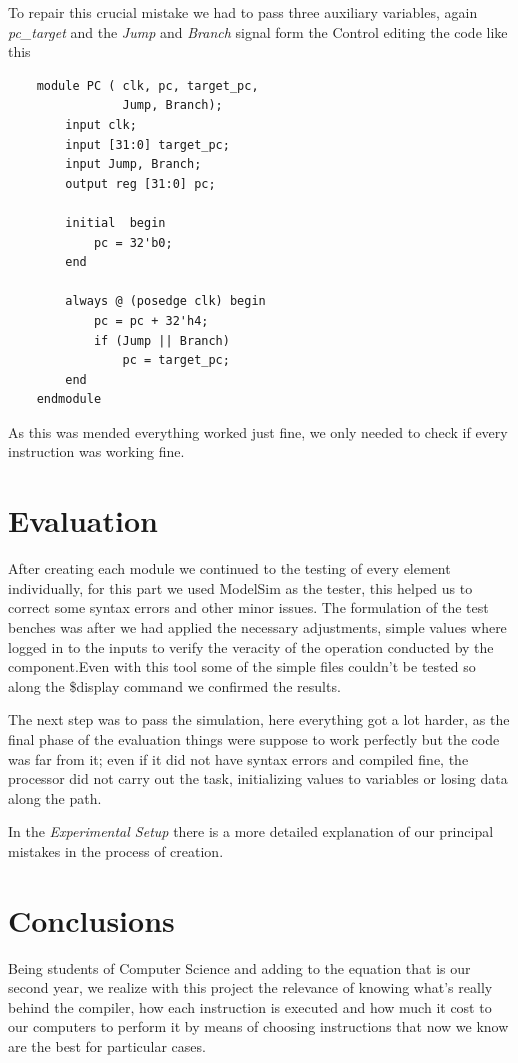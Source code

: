 \documentclass[conference]{IEEEtran}
\begin{document}
    To repair this crucial mistake we had to pass three auxiliary variables, again \textit{pc\_target} and the \textit{Jump} and \textit{Branch} signal form the Control editing the code like this
    
    \begin{lstlisting}
    module PC ( clk, pc, target_pc, 
                Jump, Branch);
    	input clk;
    	input [31:0] target_pc;
    	input Jump, Branch;
    	output reg [31:0] pc;
    
    	initial  begin
    		pc = 32'b0;
    	end
    
    	always @ (posedge clk) begin
    		pc = pc + 32'h4;
    		if (Jump || Branch)
    			pc = target_pc;
    	end
    endmodule
    \end{lstlisting}
    
    As this was mended everything worked just fine, we only needed to check if every instruction was working fine.
\section{Evaluation}
After creating each module we continued to the testing of every element individually, for this part we used ModelSim as the tester, this helped us to correct some syntax errors and other minor issues. The formulation of the test benches was after we had applied the necessary adjustments, simple values where logged in to the inputs to verify the veracity of the operation conducted by the component.Even with this tool some of the simple files couldn't be tested so along the \$display command we confirmed the results.

The next step was to pass the simulation, here everything got a lot harder, as the final phase of the evaluation things were suppose to work perfectly but the code was far from it; even if it did not have syntax errors and compiled fine, the processor did not carry out the task, initializing values to variables or losing data along the path.

In the \textit{Experimental Setup} there is a more detailed explanation of our principal mistakes in the process of creation.

\section{Conclusions}
Being students of Computer Science and adding to the equation that is our second year, we realize with this project the relevance of knowing what's really behind the compiler, how each instruction is executed and how much it cost to our computers to perform it by means of choosing instructions that now we know are the best for particular cases.  
\end{document}
